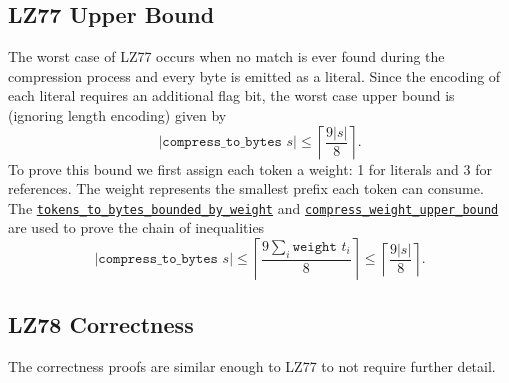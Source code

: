 \documentclass[
  a4paper, twocolumn, DIV=calc]{scrartcl}
\begin{document}
\subsection{LZ77 Upper Bound}
The worst case of LZ77 occurs when no match is ever found during the compression
process and every byte is emitted as a literal. Since the encoding of each literal 
requires an additional flag bit, the worst case upper bound is (ignoring length
encoding) given by 
$$ |\texttt{compress\_to\_bytes } s| \leqslant \left\lceil\frac{9 |s|}{8} \right\rceil .$$
To prove this bound we first assign each token a weight: 1 for literals and 3 for references.
The weight represents the smallest prefix each token can consume.
The \href{https://github.com/Jatana/LZ78FormalVerification/blob/2819b54b6eb88639461c4fd3504fbc2a87e8cbc0/lz77/LZ_Tokens.v#L727}{\texttt{tokens\_to\_bytes\_bounded\_by\_weight}}
and \href{https://github.com/Jatana/LZ78FormalVerification/blob/2819b54b6eb88639461c4fd3504fbc2a87e8cbc0/lz77/LZ.v#L196}{\texttt{compress\_weight\_upper\_bound}}
are used to prove the chain of inequalities
$$ |\texttt{compress\_to\_bytes } s| \leqslant
\left\lceil \frac{9\sum_i\texttt{weight }t_i}{8} \right\rceil \leqslant 
\left\lceil \frac{9|s|}{8} \right\rceil .$$

\subsection{LZ78 Correctness}
The correctness proofs are similar enough to LZ77 to not require further detail.
\end{document}
